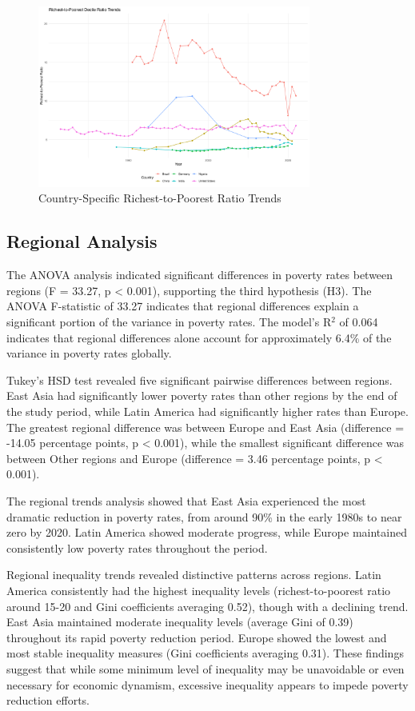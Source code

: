 \documentclass[12pt,a4paper]{article}
\begin{document}
\begin{figure}[h]
\centering
\includegraphics[width=0.8\textwidth]{../output/visualizations/country_rich_poor_trends.png}
\caption{Country-Specific Richest-to-Poorest Ratio Trends}
\end{figure}

\subsection{Regional Analysis}
The ANOVA analysis indicated significant differences in poverty rates between regions (F = 33.27, p < 0.001), supporting the third hypothesis (H3). The ANOVA F-statistic of 33.27 indicates that regional differences explain a significant portion of the variance in poverty rates. The model's R$^2$ of 0.064 indicates that regional differences alone account for approximately 6.4\% of the variance in poverty rates globally.

Tukey's HSD test revealed five significant pairwise differences between regions. East Asia had significantly lower poverty rates than other regions by the end of the study period, while Latin America had significantly higher rates than Europe. The greatest regional difference was between Europe and East Asia (difference = -14.05 percentage points, p < 0.001), while the smallest significant difference was between Other regions and Europe (difference = 3.46 percentage points, p < 0.001).

The regional trends analysis showed that East Asia experienced the most dramatic reduction in poverty rates, from around 90\% in the early 1980s to near zero by 2020. Latin America showed moderate progress, while Europe maintained consistently low poverty rates throughout the period.

Regional inequality trends revealed distinctive patterns across regions. Latin America consistently had the highest inequality levels (richest-to-poorest ratio around 15-20 and Gini coefficients averaging 0.52), though with a declining trend. East Asia maintained moderate inequality levels (average Gini of 0.39) throughout its rapid poverty reduction period. Europe showed the lowest and most stable inequality measures (Gini coefficients averaging 0.31). These findings suggest that while some minimum level of inequality may be unavoidable or even necessary for economic dynamism, excessive inequality appears to impede poverty reduction efforts.
\end{document}
